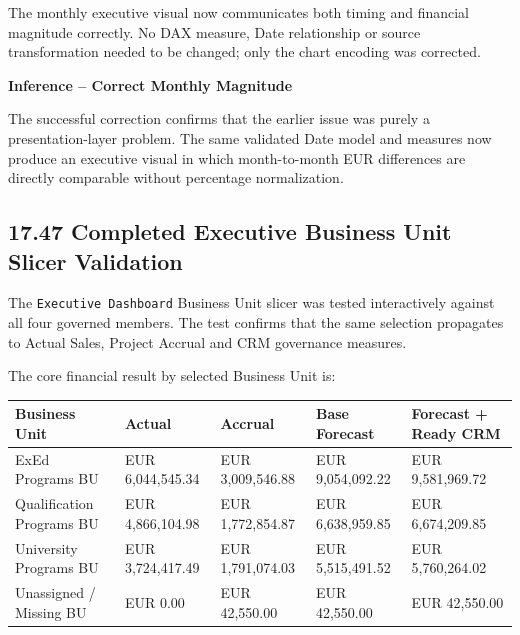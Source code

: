 \documentclass[11pt,a4paper]{article}
\begin{document}
\begin{successbox}

\textbf{\color{SuccessGreen}{Monthly Forecast Visual Correction Result}}

The monthly executive visual now communicates both timing and financial magnitude
correctly. No DAX measure, Date relationship or source transformation needed to be
changed; only the chart encoding was corrected.

\end{successbox}

\begin{inferencebox}

\textbf{Inference -- Correct Monthly Magnitude}

The successful correction confirms that the earlier issue was purely a
presentation-layer problem. The same validated Date model and measures now produce
an executive visual in which month-to-month EUR differences are directly
comparable without percentage normalization.

\end{inferencebox}


\subsection{17.47 Completed Executive Business Unit Slicer Validation}

The \texttt{Executive Dashboard} Business Unit slicer was tested interactively
against all four governed members. The test confirms that the same selection
propagates to Actual Sales, Project Accrual and CRM governance measures.

The core financial result by selected Business Unit is:

\begin{tabularx}{\textwidth}{
    >{\raggedright\arraybackslash}p{3.5cm}
    >{\raggedleft\arraybackslash}p{2.7cm}
    >{\raggedleft\arraybackslash}p{2.7cm}
    >{\raggedleft\arraybackslash}p{2.7cm}
    >{\raggedleft\arraybackslash}X
}

\toprule

Business Unit
&
Actual
&
Accrual
&
Base Forecast
&
Forecast + Ready CRM
\\

\midrule

ExEd Programs BU
&
EUR 6,044,545.34
&
EUR 3,009,546.88
&
EUR 9,054,092.22
&
EUR 9,581,969.72
\\

Qualification Programs BU
&
EUR 4,866,104.98
&
EUR 1,772,854.87
&
EUR 6,638,959.85
&
EUR 6,674,209.85
\\

University Programs BU
&
EUR 3,724,417.49
&
EUR 1,791,074.03
&
EUR 5,515,491.52
&
EUR 5,760,264.02
\\

Unassigned / Missing BU
&
EUR 0.00
&
EUR 42,550.00
&
EUR 42,550.00
&
EUR 42,550.00
\\

\bottomrule

\end{tabularx}
\end{document}
